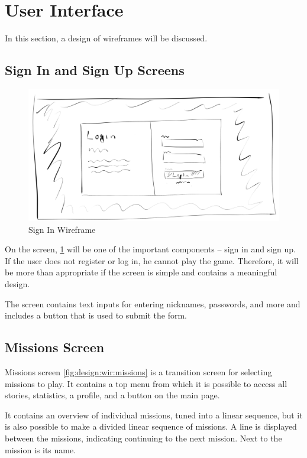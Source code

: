 \section{User Interface}
\label{design:ui}

In this section, a design of wireframes will be discussed.

\subsection{Sign In and Sign Up Screens}

\begin{figure}
    \centering
    \includegraphics[width=1\linewidth]{assets/design/ui/wir_login.png}
    \caption{Sign In Wireframe}
    \label{fig:design:wir:login}
\end{figure}

On the screen, \ref{fig:design:wir:login} will be one of the important components -- sign in and sign up.
If the user does not register or log in, he cannot play the game.
Therefore, it will be more than appropriate if the screen is simple and contains a meaningful design.

The screen contains text inputs for entering nicknames, passwords, and more and includes a button that is used to submit the form.

\subsection{Missions Screen}

Missions screen \ref{fig:design:wir:missions} is a transition screen for selecting missions to play.
It contains a top menu from which it is possible to access all stories, statistics, a profile, and a button on the main page.

It contains an overview of individual missions, tuned into a linear sequence, but it is also possible to make a divided linear sequence of missions.
A line is displayed between the missions, indicating continuing to the next mission.
Next to the mission is its name.

